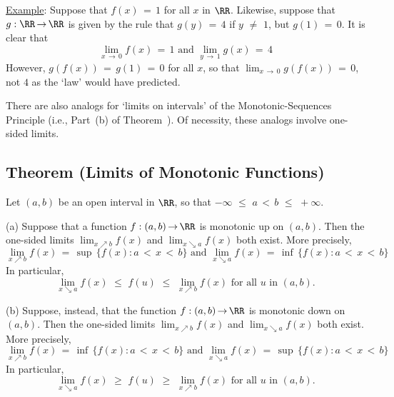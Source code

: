 {\V

        \underline{Example}: Suppose that $f(x) \,=\, 1$ for all $x$ in ${\RR}$.
    Likewise, suppose that $g:{\RR} \,{\rightarrow}\, {\RR}$ is given by the rule that $g(y) \,=\, 4$ if $y \,\,{\neq}\,\, 1$, but $g(1) \,=\, 0$.
    It is clear that
        \begin{displaymath}
        \lim_{x \,{\rightarrow}\, 0} f(x) \,=\, 1 \mbox{ and } 
        \lim_{y \,{\rightarrow}\, 1} g(x) \,=\, 4
        \end{displaymath}
    However, $g(f(x)) \,=\, g(1) \,=\, 0$ for all $x$, so that ${\displaystyle \lim_{x \,{\rightarrow}\, 0} g(f(x))} \,=\, 0$, not $4$ as the `law' would have predicted.

\V
\V

        There are also analogs for `limits on intervals' of the Monotonic-Sequences Principle (i.e., Part~(b) of Theorem~).
    Of necessity, these analogs involve one-sided limits.

\V

            \subsection{\small{\bf Theorem (Limits of Monotonic Functions)}}
            \label{ThmC90.90}

        Let $(a,b)$ be an open interval in ${\RR}$, so that $-{\infty}\,\,{\leq}\,\,a\,<\,b\,\,{\leq}\,\,+{\infty}$.

\V

       (a) Suppose that a function $f:(a,b) \,{\rightarrow}\, {\RR}$ is monotonic up on $(a,b)$. Then the one-sided limits $\lim_{x{\nearrow}b} f(x)$ and $\lim_{x{\searrow}a} f(x)$ both exist.
    More precisely,
        \begin{displaymath}
        \lim_{x{\nearrow}b} f(x) \,=\, {\sup}\,\{f(x): a\,<\,x\,<\,b\}
    \mbox{ and }
        \lim_{x{\searrow}a} f(x) \,=\, {\inf}\,\{f(x): a\,<\,x\,<\,b\}
        \end{displaymath}
    In particular, 
        \begin{displaymath}
        \lim_{x{\searrow}a} f(x)\,\,{\leq}\,\,f(u)\,\,{\leq}\,\,\lim_{x{\nearrow}b} f(x) \mbox{ for all $u$ in $(a,b)$}.
        \end{displaymath}

\V

        (b) Suppose, instead, that the function $f:(a,b) \,{\rightarrow}\, {\RR}$ is monotonic down on $(a,b)$.
    Then the one-sided limits $\lim_{x{\nearrow}b} f(x)$ and $\lim_{x{\searrow}a} f(x)$ both exist.
    More precisely,
        \begin{displaymath}
        \lim_{x{\nearrow}b} f(x) \,=\, {\inf}\,\{f(x): a\,<\,x\,<\,b\}
    \mbox{ and }
        \lim_{x{\searrow}a} f(x) \,=\, {\sup}\,\{f(x): a\,<\,x\,<\,b\}
        \end{displaymath}
    In particular, 
        \begin{displaymath}
        \lim_{x{\searrow}a} f(x)\,\,{\geq}\,\,f(u)\,\,{\geq}\,\,\lim_{x{\nearrow}b} f(x) \mbox{ for all $u$ in $(a,b)$}.
        \end{displaymath}

}

